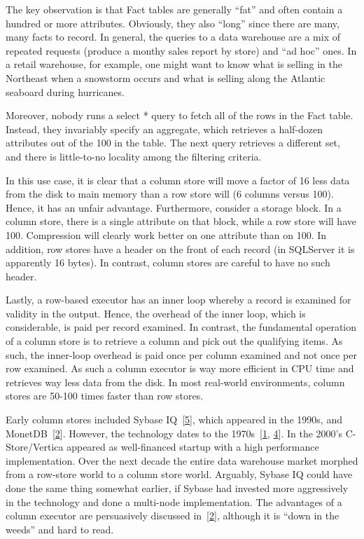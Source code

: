 \documentclass[b5paper,11pt,twoside,openright]{book}
\begin{document}
The key observation is that Fact tables are generally ``fat'' and often
contain a hundred or more attributes. Obviously, they also ``long''
since there are many, many facts to record. In general, the queries to a
data warehouse are a mix of repeated requests (produce a monthy sales
report by store) and ``ad hoc'' ones. In a retail warehouse, for
example, one might want to know what is selling in the Northeast when a
snowstorm occurs and what is selling along the Atlantic seaboard during
hurricanes.

Moreover, nobody runs a select * query to fetch all of the rows in the
Fact table. Instead, they invariably specify an aggregate, which
retrieves a half-dozen attributes out of the 100 in the table. The next
query retrieves a different set, and there is little-to-no locality
among the filtering criteria.

In this use case, it is clear that a column store will move a factor of
16 less data from the disk to main memory than a row store will (6
columns versus 100). Hence, it has an unfair advantage. Furthermore,
consider a storage block. In a column store, there is a single attribute
on that block, while a row store will have 100. Compression will clearly
work better on one attribute than on 100. In addition, row stores have a
header on the front of each record (in SQLServer it is apparently 16
bytes). In contrast, column stores are careful to have no such header.

Lastly, a row-based executor has an inner loop whereby a record is
examined for validity in the output. Hence, the overhead of the inner
loop, which is considerable, is paid per record examined. In contrast,
the fundamental operation of a column store is to retrieve a column and
pick out the qualifying items. As such, the inner-loop overhead is paid
once per column examined and not once per row examined. As such a column
executor is way more efficient in CPU time and retrieves way less data
from the disk. In most real-world environments, column stores are 50-100
times faster than row stores.

Early column stores included Sybase
IQ~{{[}\protect\hyperlink{ref-sybase}{5}{]}}, which appeared in the
1990s, and MonetDB~{{[}\protect\hyperlink{ref-monetdb}{2}{]}}. However,
the technology dates to the
1970s~{{[}\protect\hyperlink{ref-earlycolumn1}{1},
  \protect\hyperlink{ref-earlycolumn2}{4}{]}}. In the 2000's
C-Store/Vertica appeared as well-financed startup with a high
performance implementation. Over the next decade the entire data
warehouse market morphed from a row-store world to a column store world.
Arguably, Sybase IQ could have done the same thing somewhat earlier, if
Sybase had invested more aggressively in the technology and done a
multi-node implementation. The advantages of a column executor are
persuasively discussed in~{{[}\protect\hyperlink{ref-monetdb}{2}{]}},
although it is ``down in the weeds'' and hard to read.
\end{document}
